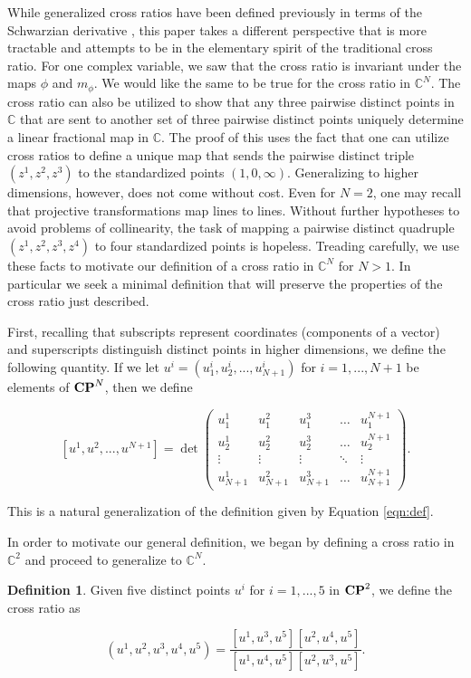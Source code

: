 \documentclass{amsart}
\theoremstyle{theorem}
\theoremstyle{lemma}
\theoremstyle{definition}
\newtheorem*{definition}{Definition}
\begin{document}
While generalized cross ratios have been defined previously in terms of the Schwarzian derivative \cite{Gong}, this paper takes a different perspective that is more tractable and attempts to be in the elementary spirit of the traditional cross ratio. For one complex variable, we saw that the cross ratio is invariant under the maps $\phi$ and $m_{\phi}$. We would like the same to be true for the cross ratio in $\mathbb{C}^N$. The cross ratio can also be utilized to show that any three pairwise distinct points in $\mathbb{C}$ that are sent to another set of three pairwise distinct points uniquely determine a linear fractional map in $\mathbb{C}$. The proof of this uses the fact that one can utilize cross ratios to define a unique map that sends the pairwise distinct triple $(z^1,z^2,z^3)$  to the standardized points $(1,0, \infty)$. Generalizing to higher dimensions, however, does not come without cost. Even for $N=2$, one may recall that projective transformations map lines to lines.  Without further hypotheses to avoid problems of collinearity, the task of mapping a pairwise distinct quadruple $(z^1,z^2,z^3, z^4)$ to four standardized points is hopeless. Treading carefully, we use these facts to motivate our definition of a cross ratio in $\mathbb{C}^N$ for $N>1$. In particular we seek a minimal definition that will preserve the properties of the cross ratio just described.

First, recalling that subscripts represent coordinates (components of a vector) and superscripts distinguish distinct points in higher dimensions, we define the following quantity. If we let $u^i=(u^i_1, u^i_2,...,u^i_{N+1})$ for $i=1,...,N+1$ be elements of ${\bf CP}^N$, then we define

$$[u^1, u^2,...,u^{N+1}]=\det \begin{pmatrix}
    u^1_1 & u_1^2 & u_1^3 & \dots  & u_1^{N+1} \\
    u_2^1 & u_2^2 & u_2^3 & \dots  & u_2^{N+1} \\
    \vdots & \vdots & \vdots & \ddots & \vdots \\
    u_{N+1}^1 & u_{N+1}^2 & u_{N+1}^3 & \dots  & u_{N+1}^{N+1}
\end{pmatrix}.$$

This is a natural generalization of the definition given by Equation \ref{eqn:def}.

In order to motivate our general definition, we began by defining a cross ratio in $\mathbb{C}^2$ and proceed to generalize to $\mathbb{C}^N$.

\begin{definition}
Given five distinct points $u^i$ for $i=1,...,5$ in ${\bf CP}^2$, we define the cross ratio as 

$$(u^1, u^2, u^3, u^4, u^5)=\frac{[u^1, u^3, u^5][u^2, u^4, u^5]}{[u^1, u^4, u^5][u^2, u^3, u^5]}.$$

\end{definition}
\end{document}
